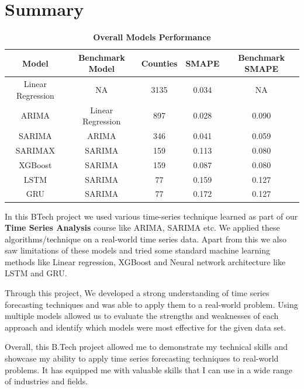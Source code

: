 \documentclass{article}
\begin{document}
\section{Summary}

\vspace{2em}
\begin{table}[h]
	\centering
	\caption*{\textbf{Overall Models Performance}}
	\begin{tabular}{|c| c | c| c | c |}
		\hline
		\textbf{Model} & \textbf{Benchmark Model} & \textbf{Counties} & \textbf{SMAPE} & \textbf{Benchmark SMAPE}  \\
		\hline
		Linear Regression & NA & 3135 & 0.034 & NA \\
		\hline
		ARIMA & Linear Regression & 897 & 0.028 & 0.090 \\
		\hline
		SARIMA & ARIMA & 346 &  0.041 & 0.059 \\
		\hline
		SARIMAX & SARIMA & 159 & 0.113 &  0.080 \\
		\hline
		XGBoost & SARIMA &  159 & 0.087 & 0.080 \\
		\hline
		LSTM & SARIMA & 77 & 0.159 & 0.127 \\
		\hline
		GRU & SARIMA & 77 & 0.172 & 0.127 \\
		\hline
	\end{tabular}
\end{table}

\vspace{1em}
In this BTech project we used various time-series technique learned as part of our \textbf{Time Series Analysis} course like ARIMA, SARIMA etc. We applied these algorithms/technique on a real-world time series data. Apart from this we also saw limitations of these models and tried some standard machine learning methods like Linear regression, XGBoost and Neural network architecture like LSTM and GRU. 

\vspace{1em}
Through this project, We developed a strong understanding of time series forecasting techniques and was able to apply them to a real-world problem. Using multiple models allowed us to evaluate the strengths and weaknesses of each approach and identify which models were most effective for the given data set.

\vspace{1em}
Overall, this B.Tech project allowed me to demonstrate my technical skills and showcase my ability to apply time series forecasting techniques to real-world problems. It has equipped me with valuable skills that I can use in a wide range of industries and fields. 



\nocite{rnn_article,stat_quest}

\end{document}
